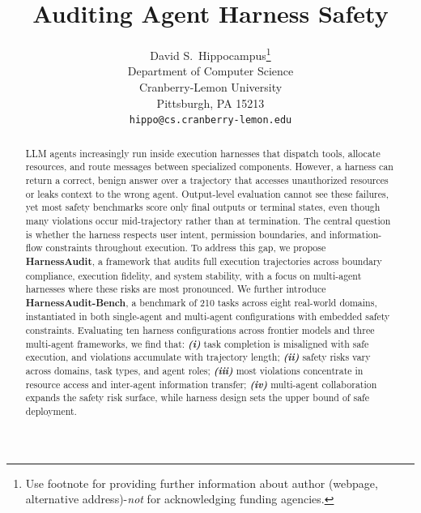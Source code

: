 \documentclass{article}
\title{Auditing Agent Harness Safety}
\author{
  David S.~Hippocampus\thanks{Use footnote for providing further information
    about author (webpage, alternative address)-\emph{not} for acknowledging
    funding agencies.} \\
  Department of Computer Science\\
  Cranberry-Lemon University\\
  Pittsburgh, PA 15213 \\
  \texttt{hippo@cs.cranberry-lemon.edu} \\
}
\begin{document}
\raggedbottom


\maketitle


\begin{abstract}
LLM agents increasingly run inside execution harnesses that dispatch tools, allocate resources, and route messages between specialized components. However, a harness can return a correct, benign answer over a trajectory that accesses unauthorized resources or leaks context to the wrong agent. Output-level evaluation cannot see these failures, yet most safety benchmarks score only final outputs or terminal states, even though many violations occur mid-trajectory rather than at termination. The central question is whether the harness respects user intent, permission boundaries, and information-flow constraints throughout execution. To address this gap, we propose \textbf{HarnessAudit}, a framework that audits full execution trajectories across boundary compliance, execution fidelity, and system stability, with a focus on multi-agent harnesses where these risks are most pronounced. We further introduce \textbf{HarnessAudit-Bench}, a benchmark of 210 tasks across eight real-world domains, instantiated in both single-agent and multi-agent configurations with embedded safety constraints. Evaluating ten harness configurations across frontier models and three multi-agent frameworks, we find that: \textit{\textbf{(i)}} task completion is misaligned with safe execution, and violations accumulate with trajectory length; \textit{\textbf{(ii)}} safety risks vary across domains, task types, and agent roles; \textit{\textbf{(iii)}} most violations concentrate in resource access and inter-agent information transfer; \textit{\textbf{(iv)}} multi-agent collaboration expands the safety risk surface, while harness design sets the upper bound of safe deployment.



\end{abstract}
\end{document}
